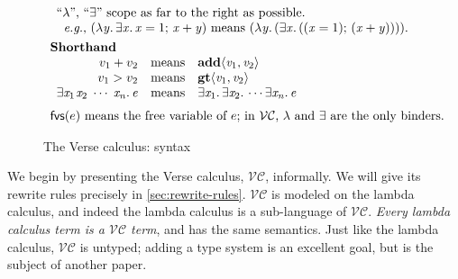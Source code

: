 \documentclass[acmsmall,review,dvipsnames]{acmart}
\newcommand{\Varid}[1]{\mathit{#1}}
\renewcommand{\geq}{\geqslant}
\newcommand{\eg}{\emph{e.g.}}
\newcommand{\versecalc}{$\mathcal{VC}$}
\newcommand{\freevars}[1]{\mathsf{fvs}(#1)}
\newcommand{\disjoint}{\;\#\;}
\begin{document}
\begin{figure}
$$\begin{array}{l}
\begin{array}[t]{l}
          \text{``$\lambda$'', ``\ensuremath{\exists}'' scope as far to the right as possible.} \\
          \hspace{2mm} \text{{\eg}, \ensuremath{(\lambda\Varid{y}.\,\exists\Varid{x}.\,\Varid{x}\mathrel{=}\mathrm{1};\,\Varid{x}\mathbin{+}\Varid{y})} means \ensuremath{(\lambda\Varid{y}.\,(\exists\Varid{x}.\,((\Varid{x}\mathrel{=}\mathrm{1});\,(\Varid{x}\mathbin{+}\Varid{y}))))}.}
    \end{array} \\ \\[-3mm]
    \textbf{Shorthand} \\
    \begin{array}{rcl}
      v_1 + v_2 & \text{means} & \ensuremath{\textbf{add}\langle\Varid{v}_{\mathrm{1}},\Varid{v}_{\mathrm{2}}\rangle} \\
      v_1 > v_2 & \text{means} & \ensuremath{\textbf{gt}\langle\Varid{v}_{\mathrm{1}},\Varid{v}_{\mathrm{2}}\rangle} \\
      \ensuremath{\exists\Varid{x}_{\mathrm{1}}\hspace{0.3mm}\Varid{x}_{\mathrm{2}}\;\cdots\;\Varid{x}_{\Varid{n}}.\,\Varid{e}} & \text{means} & \ensuremath{\exists\Varid{x}_{\mathrm{1}}.\,\exists\Varid{x}_{\mathrm{2}}.\,\cdots \exists\Varid{x}_{\Varid{n}}.\,\Varid{e}} \\
     \end{array} \\
  \\[-2mm]
  \text{$\freevars{e}$ means the free variable of $e$; in \versecalc{}, $\lambda$ and \ensuremath{\exists} are the only binders.}
  \end{array}
  $$
\caption{The Verse calculus: syntax} \label{fig:syntax}
\end{figure}

We begin by presenting the Verse calculus, \versecalc, informally.  We will give its
rewrite rules precisely in \cref{sec:rewrite-rules}.
\versecalc{} is modeled on the lambda calculus, and indeed the lambda calculus is
a sub-language of \versecalc{}.  \emph{Every lambda calculus term is a \versecalc{} term},
and has the same semantics. Just like the lambda calculus, \versecalc{} is untyped;
adding a type system is an excellent goal, but is the subject of another paper.
\end{document}
